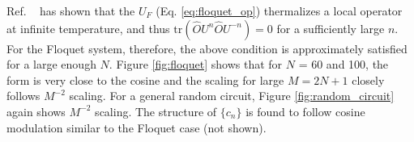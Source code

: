 \documentclass[twocolumn,superscriptaddress, prb]{revtex4-1}
\begin{document}
Ref. ~ has shown that the $U_F$ (Eq. \eqref{eq:floquet_op}) thermalizes a local operator at infinite temperature,
and thus $\mathrm{tr}(\hat{O}U^n\hat{O}U^{-n}) = 0$ for a sufficiently large $n$.
For the Floquet system, therefore, the above condition is approximately satisfied for a large enough $N$.
Figure \ref{fig:floquet} shows that for $N$ = 60 and 100, the form is very close to the cosine
and the scaling for large $M = 2N +1$ closely follows $M^{-2}$ scaling.
For a general random circuit, Figure \ref{fig:random_circuit} again shows $M^{-2}$ scaling. The structure of $\{c_n\}$
is found to follow cosine modulation similar to the Floquet case (not shown).
\end{document}
